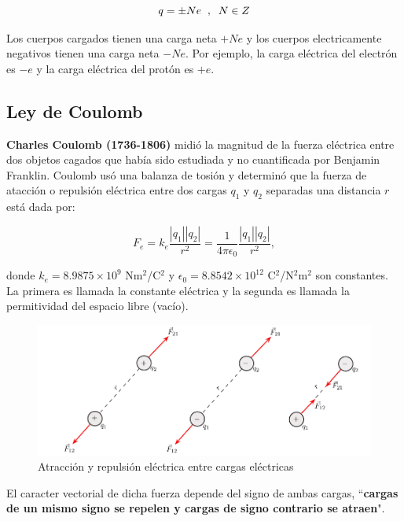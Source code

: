 \begin{equation}
q=\pm N e \hspace{0.2 cm},\hspace{0.2 cm} N \in Z
\end{equation}

Los cuerpos cargados tienen una carga neta $+Ne$ y los cuerpos electricamente negativos tienen una carga neta $-Ne$. Por ejemplo, la carga eléctrica del electrón es $-e$ y la carga eléctrica del protón es $+e$. 
\subsection{Ley de Coulomb}

\textbf{Charles Coulomb (1736-1806)} midió la magnitud de la fuerza eléctrica entre dos objetos cagados que había sido estudiada y no cuantificada por Benjamin Franklin. Coulomb usó una balanza de tosión y determinó que la fuerza de atacción o repulsión eléctrica entre dos cargas $q_1$ y $q_2$ separadas una distancia $r$ está dada por:


\begin{equation}
F_e=k_e \dfrac{|q_1||q_2|}{r^2}=\dfrac{1}{4\pi \epsilon_0 } \dfrac{|q_1||q_2|}{r^2} ,
\end{equation}

donde $k_e=8.9875 \times 10^9$ Nm$^2$/C$^2$ y $\epsilon_0=8.8542 \times 10^12 $ C$^2$/N$^2$m$^2$ son constantes. La primera es llamada la constante eléctrica y la segunda es llamada la permitividad del 
espacio libre (vacío).

\begin{figure}[h]
\begin{center}
\includegraphics[scale=0.9]{electrostatica/coulomb}
\end{center}
\caption{Atracción y repulsión eléctrica entre cargas eléctricas}
\end{figure}

El caracter vectorial de dicha fuerza depende del signo de ambas cargas, ``\textbf{cargas de un mismo signo se repelen y cargas de signo contrario se atraen}".

